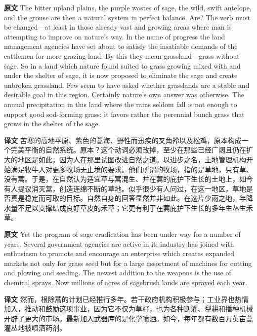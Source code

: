 \documentclass[UTF8,zihao=-4]{ctexart}
\begin{document}
\noindent\textbf{原文} The bitter upland plains, the purple wastes of sage, the wild, swift antelope, and the grouse are then a natural system in perfect balance. Are? The verb must be changed---at least in those already vast and growing areas where man is attempting to improve on nature's way. In the name of progress the land management agencies have set about to satisfy the insatiable demands of the cattlemen for more grazing land. By this they mean grassland---grass without sage. So in a land which nature found suited to grass growing mixed with and under the shelter of sage, it is now proposed to eliminate the sage and create unbroken grassland. Few seem to have asked whether grasslands are a stable and desirable goal in this region. Certainly nature's own answer was otherwise. The annual precipitation in this land where the rains seldom fall is not enough to support good sod-forming grass; it favors rather the perennial bunch grass that grows in the shelter of the sage.
\par
\noindent\textbf{译文} 苦寒的高地平原、紫色的蒿海、野性而迅疾的叉角羚以及松鸡，原本构成一个完美平衡的自然系统。原本？这个动词必须改掉，至少在那些已经广阔且仍在扩大的地区是如此，因为人在那里试图改进自然之道。以进步之名，土地管理机构开始满足牧牛人对更多牧场无止境的要求。他们所谓的牧场，指的是草地，只有草、没有蒿。于是，在自然认为适宜草与蒿混生、并在蒿的庇护下生长的土地上，如今有人提议消灭蒿，创造连绵不断的草地。似乎很少有人问过，在这一地区，草地是否真是稳定而可取的目标。自然自身的回答显然并非如此。在这片少雨之地，年降水量不足以支撑结成良好草皮的禾草；它更有利于在蒿庇护下生长的多年生丛生禾草。
\par\medskip

\noindent\textbf{原文} Yet the program of sage eradication has been under way for a number of years. Several government agencies are active in it; industry has joined with enthusiasm to promote and encourage an enterprise which creates expanded markets not only for grass seed but for a large assortment of machines for cutting and plowing and seeding. The newest addition to the weapons is the use of chemical sprays. Now millions of acres of sagebrush lands are sprayed each year.
\par
\noindent\textbf{译文} 然而，根除蒿的计划已经推行多年。若干政府机构积极参与；工业界也热情加入，推动和鼓励这项事业，因为它不仅为草籽，也为各种割灌、犁耕和播种机械开辟了更大的市场。最新加入武器库的是化学喷洒。如今，每年都有数百万英亩蒿灌丛地被喷洒药剂。
\par\medskip
\end{document}
